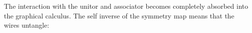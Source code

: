 The interaction with the unitor and associator becomes completely absorbed into the graphical calculus.
%
The self inverse of the symmetry map means that the wires untangle:
